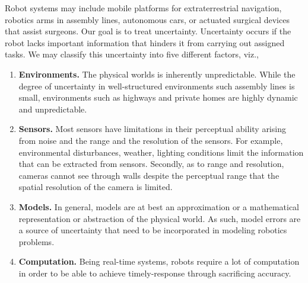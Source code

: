 Robot systems may include mobile platforms for extraterrestrial navigation, robotics arms in assembly lines, autonomous cars, or actuated surgical devices that assist surgeons. Our goal is to treat uncertainty. Uncertainty occurs if the robot lacks important information that hinders it from carrying out assigned tasks. We may classify this uncertainty into five different factors, viz.,
%
\begin{enumerate}
	\item \textbf{Environments.} The physical worlds is inherently unpredictable. While the degree of uncertainty in well-structured environments such assembly lines is small, environments such as highways and private homes are highly dynamic and unpredictable.
	\item \textbf{Sensors.} Most sensors have limitations in their perceptual ability arising from noise and the range and the resolution of the sensors. For example, environmental disturbances, weather, lighting conditions limit the information that can be extracted from sensors. Secondly, as to range and resolution, cameras cannot see through walls despite the perceptual range that the spatial resolution of the camera is limited.
	\item \textbf{Models.} In general, models are at best an approximation or a mathematical representation or abstraction of the physical world. As such, model errors are a source of uncertainty that need to be incorporated in modeling robotics problems.
	\item \textbf{Computation.} Being real-time systems, robots require a lot of computation in order to be able to achieve timely-response through sacrificing accuracy.
\end{enumerate}

